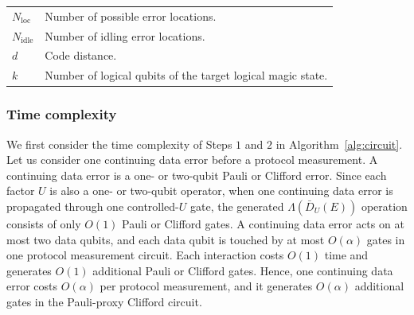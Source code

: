 \documentclass[
 reprint,
 amsmath,amssymb,
 pra,superscriptaddress, nofootinbib
]{revtex4-2}
\theoremstyle{definition}
\theoremstyle{plain}
\begin{document}
{\begin{table}
\begin{tabular}{ll}
\parbox[t]{2.5cm}{\raggedright $N_{\mathrm{loc}}$}
& \parbox[t]{14cm}{\raggedright Number of possible error locations.} \\

\parbox[t]{2.5cm}{\raggedright $N_{\mathrm{idle}}$}
& \parbox[t]{14cm}{\raggedright Number of idling error locations.} \\

\parbox[t]{2.5cm}{\raggedright $d$}
& \parbox[t]{14cm}{\raggedright Code distance.} \\

\parbox[t]{2.5cm}{\raggedright $k$}
& \parbox[t]{14cm}{\raggedright Number of logical qubits of the target logical magic state.} \\

\hline \hline
\end{tabular}
\label{tab:complexity_notations}
\end{table}
}

\subsubsection{Time complexity}
\label{subsubsec:time}

We first consider the time complexity of Steps $1$ and $2$ in Algorithm~\ref{alg:circuit}. Let us consider one continuing data error before a protocol measurement. A continuing data error is a one- or two-qubit Pauli or Clifford error.
Since each factor $U$ is also a one- or two-qubit operator, when one continuing data error is propagated through one controlled-$U$ gate, the generated $\Lambda(\bar{D}_U(E))$ operation consists of only $O(1)$ Pauli or Clifford gates.
A continuing data error acts on at most two data qubits, and each data qubit is touched by at most $O(\alpha)$ gates in one protocol measurement circuit. Each interaction costs $O(1)$ time and generates $O(1)$ additional Pauli or Clifford gates. Hence, one continuing data error costs $O(\alpha)$ per protocol measurement, and it generates $O(\alpha)$ additional gates in the Pauli-proxy Clifford circuit.
\end{document}
